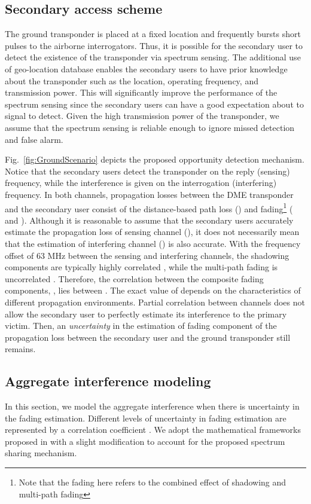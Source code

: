 \documentclass[12pt,submission,journal,onecolumn]{IEEEtran}
\begin{document}
\subsection{Secondary access scheme}
\label{subsec:GroundScheme}
The ground transponder is placed at a fixed location and frequently bursts short pulses to the airborne interrogators. Thus, it is possible for the secondary user to detect the existence of the transponder via spectrum sensing. The additional use of geo-location database enables the secondary users to have prior knowledge about the transponder such as the location, operating frequency, and transmission power. This will significantly improve the performance of the spectrum sensing since the secondary users can have a good expectation about to signal to detect. Given the high transmission power of the transponder, we assume that the spectrum sensing is reliable enough to ignore missed detection and false alarm.

Fig.~\ref{fig:GroundScenario} depicts the proposed opportunity detection mechanism. Notice that the secondary users detect the transponder on the reply (sensing) frequency, while the interference is given on the interrogation (interfering) frequency. In both channels, propagation losses between the DME transponder and the secondary user consist of the distance-based path loss () and fading\footnote{Note that the fading here refers to the combined effect of shadowing and multi-path fading} ( and ). Although it is reasonable to assume that the secondary users accurately estimate the propagation loss of sensing channel (), it does not necessarily mean that the estimation of interfering channel () is also accurate. With the frequency offset of 63 MHz between the sensing and interfering channels, the shadowing components are typically highly correlated \cite{188579}, while the multi-path fading is uncorrelated . Therefore, the correlation between the composite fading components, , lies between . The exact value of  depends on the characteristics of different propagation environments. Partial correlation between channels does not allow the secondary user to perfectly estimate its interference to the primary victim. Then, an \emph{uncertainty} in the estimation of fading component of the propagation loss between the secondary user and the ground transponder still remains. 
\subsection{Aggregate interference modeling}
\label{subsec:interferenceGround}
In this section, we model the aggregate interference when there is uncertainty in the fading estimation. Different levels of uncertainty in fading estimation are represented by a correlation coefficient . We adopt the mathematical frameworks proposed in \cite{5936226,gs0801,5701700} with a slight modification to account for the proposed spectrum sharing mechanism.
\end{document}

